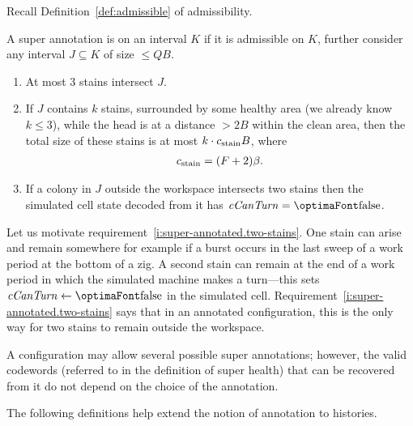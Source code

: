\documentclass[12pt]{memoir}
\renewcommand{\le}{\leq}
\newcommand{\fld}[1]{\ensuremath{\textit{#1\/}}}
\def\B{B}
\newcommand{\Q}{Q}
\newcommand{\F}{F}
\newcommand{\cCanTurn}{\fld{cCanTurn}}
\newcommand{\cns}[1]{c_{\textrm{\upshape #1}}}
\begin{document}
Recall Definition~\ref{def:admissible} of admissibility.
  \begin{definition}\label{def:super-admissible}
A super annotation is  on an interval \( K \) if it is admissible on \( K \),
further consider any interval \( J\subseteq K\) of size \( \le\Q\B \).
\begin{enumerate}[label=\upshape{\alph*)},ref=\thelemma.\upshape{\alph*},resume=admissible]
\item At most 3 stains intersect \( J \).
\item If \( J \) contains \( k \) stains, surrounded by some healthy area
(we already know \( k\le 3 \)), while the head is at a distance \( >2\B \) within the clean area,
then the total size of these stains is at most \( k\cdot\cns{stain}\B \), where
\begin{align}\label{eq:stain}
   \cns{stain} = (\F+2)\beta.
 \end{align}
\item\label{i:super-annotated.two-stains} If a colony in \( J \) outside the workspace intersects two stains then the 
simulated cell state decoded from it has \( \cCanTurn = \false \).
\end{enumerate}
\end{definition}

Let us motivate requirement~\ref{i:super-annotated.two-stains}.  
One stain can arise and remain somewhere for example if a burst occurs in the
last sweep of a work period at the bottom of a zig.
A second stain can remain at the end of a work period in which the simulated
machine makes a turn---this sets \( \cCanTurn\gets\false \) in the simulated
cell.
Requirement~\ref{i:super-annotated.two-stains} says that in an annotated
configuration, this is the only way for two stains to remain outside the
workspace.

A configuration may allow several possible super annotations;
however, the valid codewords (referred to in the definition
of super health) that can be recovered from it do not depend on the choice of the
annotation.


The following definitions help extend the notion of annotation to histories.
\end{document}
